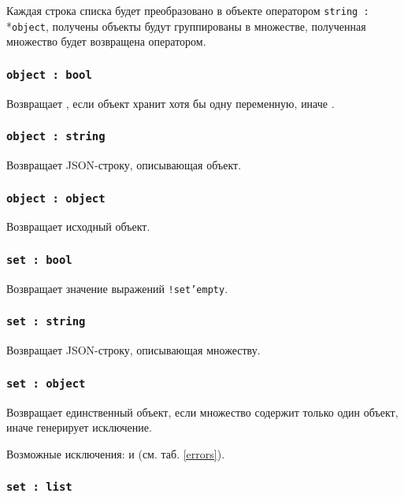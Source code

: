 Каждая строка списка будет преобразовано в объекте оператором \texttt{string :}\\*\texttt{object}, получены объекты будут группированы в множестве, полученная множество будет возвращена оператором.

\subsubsection{\texttt{object : bool}}

Возвращает \true, если объект хранит хотя бы одну переменную, иначе \false.

\subsubsection{\texttt{object : string}}

Возвращает JSON-строку, описывающая объект.

\subsubsection{\texttt{object : object}}

Возвращает исходный объект.

\subsubsection{\texttt{set : bool}}

Возвращает значение выражений \texttt{!set'empty}.

\subsubsection{\texttt{set : string}}

Возвращает JSON-строку, описывающая множеству.

\subsubsection{\texttt{set : object}}

Возвращает единственный объект, если множество содержит только один объект, иначе генерирует исключение.

Возможные исключения:  и  (см. таб. \ref{errors}).

\subsubsection{\texttt{set : list}}

